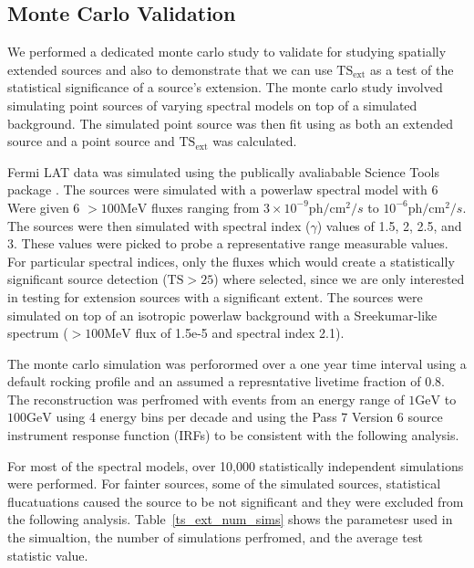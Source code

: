 \documentclass[preprint]{aastex}
\newcommand{\mev}{\text{MeV}\xspace}
\newcommand{\gev}{\text{GeV}\xspace}
\newcommand{\ph}{\text{ph}\xspace}
\newcommand{\cm}{\text{cm}\xspace}
\newcommand{\tsext}{{\ensuremath{\text{TS}_\text{ext}}}\xspace}
\newcommand{\ts}{\text{TS}\xspace}
\newcommand{\pointlike}{\text{\em pointlike}\xspace}
\newcommand{\gtobssim}{\text{\em gtobssim}\xspace}
\begin{document}
\subsection{Monte Carlo Validation} \label{monte_carlo_validation}

We performed a dedicated monte carlo study to validate \pointlike for
studying spatially extended sources and also to demonstrate that we can
use $\tsext$ as a test of the statistical significance
of a source's extension.  The monte carlo study involved simulating point
sources of varying spectral models on top of a simulated background. The
simulated point source was then fit using \pointlike as both an extended
source and a point source and $\tsext$ was calculated.

Fermi LAT data was simulated using the publically avaliabable Science
Tools package \gtobssim\cite{GTOBSSIM_CITATION}. The sources were
simulated with a powerlaw spectral model with 6 Were given 6 $>100\mev$
fluxes ranging from $3\times 10^{-9} \ph/\cm^2/s$ to 
$10^{-6} \ph/\cm^2/s$.
The sources were then simulated with spectral index ($\gamma$) values of
1.5, 2, 2.5, and 3.  These values were picked to probe a representative
range measurable values.  For particular spectral indices, only the
fluxes which would create a statistically significant source detection
($\ts>25$) where selected, since we are only interested in
testing for extension sources with a significant extent. The sources were
simulated on top of an isotropic powerlaw background with a Sreekumar-like
spectrum ($>100\mev$ flux of 1.5e-5 and spectral index 2.1).\cite{Sreekumar
et al. ApJ 494 pag 523 1998}

The monte carlo simulation was perforormed over a one year time interval using
a default rocking profile and an assumed a represntative
livetime fraction of 0.8.
The reconstruction was perfromed with events from an energy range of
$1\gev$ to $100\gev$ using 4 energy bins per decade and using the Pass 7 Version 6
source instrument response function (IRFs) to be consistent with the following analysis.

For most of the spectral models, over 10,000 statistically independent simulations were performed.
For fainter sources, some of the simulated sources, statistical flucatuations
caused the source to be not significant and they were excluded from the following analysis.
Table~\ref{ts_ext_num_sims} shows the parametesr used in the simualtion,
the number of simulations perfromed, and the average test statistic value.
\end{document}
